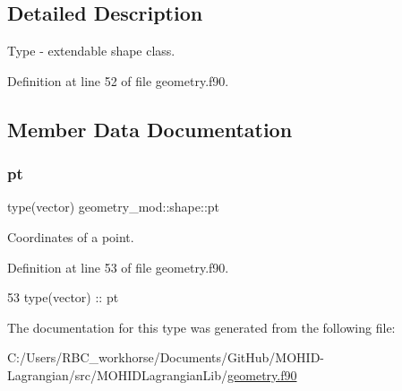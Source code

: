 \subsection{Detailed Description}
Type -\/ extendable shape class. 

Definition at line 52 of file geometry.\+f90.



\subsection{Member Data Documentation}
\mbox{\label{structgeometry__mod_1_1shape_a4c7824c0af103efbef53cbcacb9a5de0}} 
\subsubsection{\texorpdfstring{pt}{pt}}
{\footnotesize\ttfamily type(vector) geometry\+\_\+mod\+::shape\+::pt\hspace{0.3cm}{\ttfamily [private]}}



Coordinates of a point. 



Definition at line 53 of file geometry.\+f90.


\begin{DoxyCode}
53         \textcolor{keywordtype}{type}(vector) :: pt
\end{DoxyCode}


The documentation for this type was generated from the following file\+:\begin{DoxyCompactItemize}
\item 
C\+:/\+Users/\+R\+B\+C\+\_\+workhorse/\+Documents/\+Git\+Hub/\+M\+O\+H\+I\+D-\/\+Lagrangian/src/\+M\+O\+H\+I\+D\+Lagrangian\+Lib/\mbox{\hyperlink{geometry_8f90}{geometry.\+f90}}\end{DoxyCompactItemize}
